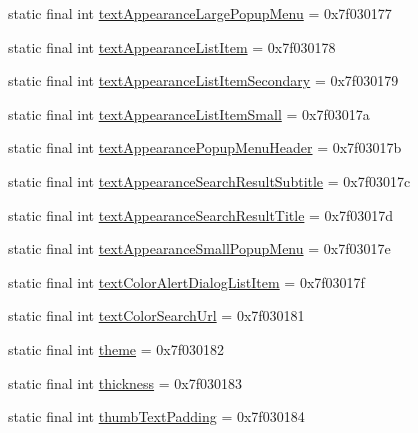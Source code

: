 \begin{DoxyCompactItemize}
static final int \mbox{\hyperlink{classcom_1_1synnapps_1_1carouselview_1_1_r_1_1attr_ab6d6638ef2fc71f4cca095341f38f7a9}{text\+Appearance\+Large\+Popup\+Menu}} = 0x7f030177
\item 
static final int \mbox{\hyperlink{classcom_1_1synnapps_1_1carouselview_1_1_r_1_1attr_ac714dafee0dfd608b6bf31e8f134f922}{text\+Appearance\+List\+Item}} = 0x7f030178
\item 
static final int \mbox{\hyperlink{classcom_1_1synnapps_1_1carouselview_1_1_r_1_1attr_afb61610bb50025090ded119356dd6361}{text\+Appearance\+List\+Item\+Secondary}} = 0x7f030179
\item 
static final int \mbox{\hyperlink{classcom_1_1synnapps_1_1carouselview_1_1_r_1_1attr_a8447cd2beacadfd2a8813392b6ee7c11}{text\+Appearance\+List\+Item\+Small}} = 0x7f03017a
\item 
static final int \mbox{\hyperlink{classcom_1_1synnapps_1_1carouselview_1_1_r_1_1attr_a888830939a59776deb2809ab33abf281}{text\+Appearance\+Popup\+Menu\+Header}} = 0x7f03017b
\item 
static final int \mbox{\hyperlink{classcom_1_1synnapps_1_1carouselview_1_1_r_1_1attr_a197da7e09b659e3d5cb188208ba58e7d}{text\+Appearance\+Search\+Result\+Subtitle}} = 0x7f03017c
\item 
static final int \mbox{\hyperlink{classcom_1_1synnapps_1_1carouselview_1_1_r_1_1attr_aed7236e9e120a65a89c732d738aab538}{text\+Appearance\+Search\+Result\+Title}} = 0x7f03017d
\item 
static final int \mbox{\hyperlink{classcom_1_1synnapps_1_1carouselview_1_1_r_1_1attr_a9eb9437068a18ce687d398f6683f5eef}{text\+Appearance\+Small\+Popup\+Menu}} = 0x7f03017e
\item 
static final int \mbox{\hyperlink{classcom_1_1synnapps_1_1carouselview_1_1_r_1_1attr_a2ba8bd1c435b2077bc061a919ec34278}{text\+Color\+Alert\+Dialog\+List\+Item}} = 0x7f03017f
\item 
static final int \mbox{\hyperlink{classcom_1_1synnapps_1_1carouselview_1_1_r_1_1attr_a8fee355d22cc50628488527b1f034cb5}{text\+Color\+Search\+Url}} = 0x7f030181
\item 
static final int \mbox{\hyperlink{classcom_1_1synnapps_1_1carouselview_1_1_r_1_1attr_a384501d8a889f21e80edd2ead3ed64f7}{theme}} = 0x7f030182
\item 
static final int \mbox{\hyperlink{classcom_1_1synnapps_1_1carouselview_1_1_r_1_1attr_a32ecd84d6ade73dfdff5603ec4025bda}{thickness}} = 0x7f030183
\item 
static final int \mbox{\hyperlink{classcom_1_1synnapps_1_1carouselview_1_1_r_1_1attr_a81de4bb494282081c49198d9e9393d2f}{thumb\+Text\+Padding}} = 0x7f030184

\end{DoxyCompactItemize}
